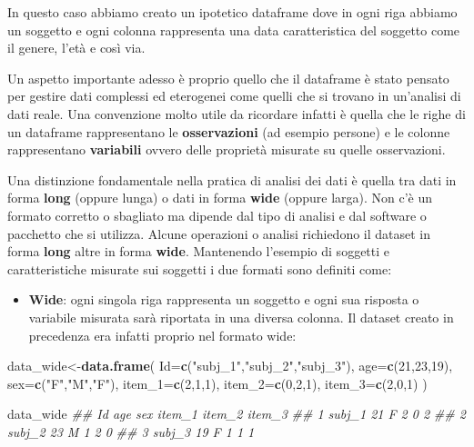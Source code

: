\documentclass[
]{book}
\newenvironment{Shaded}{\begin{snugshade}}{\end{snugshade}}
\newcommand{\CommentTok}[1]{\textcolor[rgb]{0.56,0.35,0.01}{\textit{#1}}}
\newcommand{\DataTypeTok}[1]{\textcolor[rgb]{0.13,0.29,0.53}{#1}}
\newcommand{\DecValTok}[1]{\textcolor[rgb]{0.00,0.00,0.81}{#1}}
\newcommand{\KeywordTok}[1]{\textcolor[rgb]{0.13,0.29,0.53}{\textbf{#1}}}
\newcommand{\NormalTok}[1]{#1}
\newcommand{\StringTok}[1]{\textcolor[rgb]{0.31,0.60,0.02}{#1}}
\providecommand{\tightlist}{%
  \setlength{\itemsep}{0pt}\setlength{\parskip}{0pt}}
\begin{document}
In questo caso abbiamo creato un ipotetico dataframe dove in ogni riga abbiamo un soggetto e ogni colonna rappresenta una data caratteristica del soggetto come il genere, l'età e così via.

Un aspetto importante adesso è proprio quello che il dataframe è stato pensato per gestire dati complessi ed eterogenei come quelli che si trovano in un'analisi di dati reale. Una convenzione molto utile da ricordare infatti è quella che le righe di un dataframe rappresentano le \textbf{osservazioni} (ad esempio persone) e le colonne rappresentano \textbf{variabili} ovvero delle proprietà misurate su quelle osservazioni.

Una distinzione fondamentale nella pratica di analisi dei dati è quella tra dati in forma \textbf{long} (oppure lunga) o dati in forma \textbf{wide} (oppure larga). Non c'è un formato corretto o sbagliato ma dipende dal tipo di analisi e dal software o pacchetto che si utilizza. Alcune operazioni o analisi richiedono il dataset in forma \textbf{long} altre in forma \textbf{wide}. Mantenendo l'esempio di soggetti e caratteristiche misurate sui soggetti i due formati sono definiti come:

\begin{itemize}
\tightlist
\item
  \textbf{Wide}: ogni singola riga rappresenta un soggetto e ogni sua risposta o variabile misurata sarà riportata in una diversa colonna. Il dataset creato in precedenza era infatti proprio nel formato wide:
\end{itemize}

\begin{Shaded}
\begin{Highlighting}[]
\NormalTok{data_wide<-}\KeywordTok{data.frame}\NormalTok{(}
  \DataTypeTok{Id=}\KeywordTok{c}\NormalTok{(}\StringTok{"subj_1"}\NormalTok{,}\StringTok{"subj_2"}\NormalTok{,}\StringTok{"subj_3"}\NormalTok{),}
  \DataTypeTok{age=}\KeywordTok{c}\NormalTok{(}\DecValTok{21}\NormalTok{,}\DecValTok{23}\NormalTok{,}\DecValTok{19}\NormalTok{),}
  \DataTypeTok{sex=}\KeywordTok{c}\NormalTok{(}\StringTok{"F"}\NormalTok{,}\StringTok{"M"}\NormalTok{,}\StringTok{"F"}\NormalTok{),}
  \DataTypeTok{item_1=}\KeywordTok{c}\NormalTok{(}\DecValTok{2}\NormalTok{,}\DecValTok{1}\NormalTok{,}\DecValTok{1}\NormalTok{),}
  \DataTypeTok{item_2=}\KeywordTok{c}\NormalTok{(}\DecValTok{0}\NormalTok{,}\DecValTok{2}\NormalTok{,}\DecValTok{1}\NormalTok{),}
  \DataTypeTok{item_3=}\KeywordTok{c}\NormalTok{(}\DecValTok{2}\NormalTok{,}\DecValTok{0}\NormalTok{,}\DecValTok{1}\NormalTok{)}
\NormalTok{  )}

\NormalTok{data_wide}
\CommentTok{##       Id age sex item_1 item_2 item_3}
\CommentTok{## 1 subj_1  21   F      2      0      2}
\CommentTok{## 2 subj_2  23   M      1      2      0}
\CommentTok{## 3 subj_3  19   F      1      1      1}
\end{Highlighting}
\end{Shaded}
\end{document}
